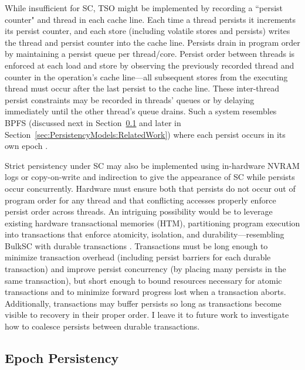 While insufficient for SC, TSO might be implemented by recording a ``persist counter" and thread in each cache line.
Each time a thread persists it increments its persist counter, and each store (including volatile stores and persists) writes the thread and persist counter into the cache line.
Persists drain in program order by maintaining a persist queue per thread/core.
Persist order between threads is enforced at each load and store by observing the previously recorded thread and counter in the operation's cache line---all subsequent stores from the executing thread must occur after the last persist to the cache line.
These inter-thread persist constraints may be recorded in threads' queues or by delaying immediately until the other thread's queue drains.
Such a system resembles BPFS (discussed next in Section~\ref{section:PersistencyModels:PersistEpochs} and later in Section~\ref{sec:PersistencyModels:RelatedWork}) where each persist occurs in its own epoch \cite{ConditNightingale09}.

Strict persistency under SC may also be implemented using in-hardware NVRAM logs or copy-on-write and indirection to give the appearance of SC while persists occur concurrently.
Hardware must ensure both that persists do not occur out of program order for any thread and that conflicting accesses properly enforce persist order across threads.
An intriguing possibility would be to leverage existing hardware transactional memories (HTM), partitioning program execution into transactions that enforce atomicity, isolation, and durability---resembling BulkSC with durable transactions \cite{CezeTuck07}.
Transactions must be long enough to minimize transaction overhead (including persist barriers for each durable transaction) and improve persist concurrency (by placing many persists in the same transaction), but short enough to bound resources necessary for atomic transactions and to minimize forward progress lost when a transaction aborts.
Additionally, transactions may buffer persists so long as transactions become visible to recovery in their proper order.
I leave it to future work to investigate how to coalesce persists between durable transactions.

\subsection{Epoch Persistency}
\label{section:PersistencyModels:PersistEpochs}

